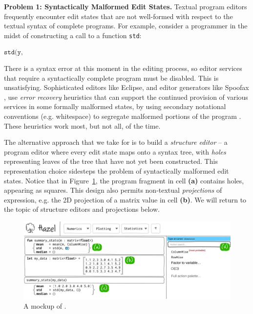 \vspace{0.25ex}
\noindent\textbf{Problem 1: Syntactically Malformed Edit States.} 
Textual program editors frequently encounter edit states
that are not well-formed with respect to the textual syntax of complete
programs. For example, consider a programmer in the midst of
constructing a call to a function \lstinline{std}: 

$\texttt{std(y, }$

There is a syntax
error at this moment in the editing process, so editor services that require a syntactically
complete program must be disabled. This is unsatisfying. Sophisticated editors like Eclipse, and editor generators like Spoofax \cite{DBLP:conf/oopsla/KatsV10}, use \emph{error recovery} heuristics that can support the continued provision 
of various services in some formally malformed states, by using secondary notational conventions (e.g. whitespace) to segregate malformed portions of the program  \cite{DBLP:conf/oopsla/KatsJNV09,DBLP:conf/sle/JongeNKV09}. These heuristics work most, but not all, of the time.

The alternative approach that we take for \HazelEnv is to build a
\emph{structure editor} -- a program editor where every edit state
maps onto a syntax tree, with \emph{holes} representing leaves of the tree
that have not yet been constructed.  This representation choice sidesteps the
problem of syntactically malformed edit states. Notice that in
Figure~\ref{fig:hazel-mockup}, the program fragment in cell
\textbf{(a)} contains holes, appearing as squares. This design also permits
non-textual \emph{projections} of expression, e.g. 
the 2D projection of a matrix value in cell \textbf{(b)}.
We will return to the topic of structure editors and projections below.


\begin{figure}
\includegraphics[width=\textwidth]{mockup-1}
\caption{A mockup of \HazelEnv.}
\label{fig:hazel-mockup}
\vspace{-2ex}
\end{figure}

